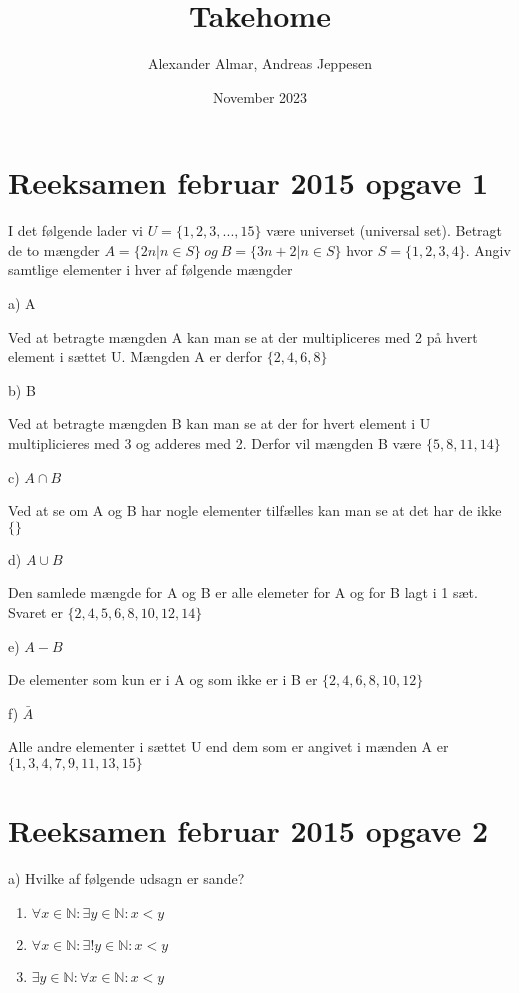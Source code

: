 \documentclass{article}
\title{Takehome}
\author{Alexander Almar, Andreas Jeppesen }
\date{November 2023}
\begin{document}
\maketitle

\section{Reeksamen februar 2015 opgave 1}
I det følgende lader vi \(U = \{1, 2, 3, . . . , 15\}\) være universet (universal set). Betragt de to mængder 
\(A = \{2n | n \in S\}\ og\ B = \{3n + 2 | n \in S\}\) hvor \(S = \{1, 2, 3, 4\}\). Angiv samtlige elementer i hver af følgende mængder

a) A

Ved at betragte mængden A kan man se at der multipliceres med 2 på hvert element i sættet U. Mængden A er derfor
\(\{2,4,6,8\}\)

b) B

Ved at betragte mængden B kan man se at der for hvert element i U multiplicieres med 3 og adderes med 2. Derfor vil mængden B være 
\(\{5,8,11,14\}\)

c) \(A \cap B\)

Ved at se om A og B har nogle elementer tilfælles kan man se at det har de ikke 
\(\{\}\)

d) \(A \cup B\)

Den samlede mængde for A og B er alle elemeter for A og for B lagt i 1 sæt. Svaret er 
\(\{2,4,5,6,8,10,12,14\}\)

e) \(A-B\)

De elementer som kun er i A og som ikke er i B er
\(\{2,4,6,8,10,12\}\)

f) \(\bar A \)

Alle andre elementer i sættet U end dem som er angivet i mænden A er 
\(\{1,3,4,7,9,11,13,15\}\)

\section{Reeksamen februar 2015 opgave 2}
a) Hvilke af følgende udsagn er sande?

\begin{enumerate}
    \item $\forall x \in\mathbb{N}: \exists y \in\mathbb{N}: x < y$
    \item $\forall x \in\mathbb{N}: \exists!y \in\mathbb{N}: x < y$
    \item $\exists y \in\mathbb{N}: \forall x \in\mathbb{N}: x < y$
\end{enumerate}
\end{document}
